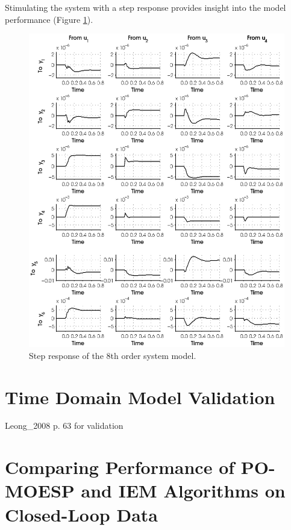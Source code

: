 Stimulating the system with a step response provides insight into the model performance (Figure \ref{fig:5_step}).
\begin{figure}[htb!]\label{fig:5_step}
	\centering
	\includegraphics{../fig/step_resp_parsim.eps}
	\caption{Step response of the 8th order system model.}
\end{figure}



\section{Time Domain Model Validation}
Leong\_2008 p. 63 for validation



\section{Comparing Performance of PO-MOESP and IEM Algorithms on Closed-Loop Data}
